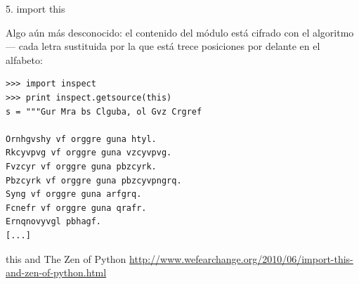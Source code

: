 \documentclass[14pt]{beamer}
\begin{document}
\begin{frame}[fragile]{5. import this}
  \small
  \begin{center}
    Algo aún más desconocido: el contenido del módulo
     está cifrado con el algoritmo
     --- cada letra sustituida por la que está trece
    posiciones por delante en el alfabeto:
  \end{center}

  \begin{exampleblock}{}
    \tiny
    \begin{lstlisting}
>>> import inspect
>>> print inspect.getsource(this)
s = """Gur Mra bs Clguba, ol Gvz Crgref

Ornhgvshy vf orggre guna htyl.
Rkcyvpvg vf orggre guna vzcyvpvg.
Fvzcyr vf orggre guna pbzcyrk.
Pbzcyrk vf orggre guna pbzcyvpngrq.
Syng vf orggre guna arfgrq.
Fcnefr vf orggre guna qrafr.
Ernqnovyvgl pbhagf.
[...]
    \end{lstlisting}
  \end{exampleblock}

  \scriptsize
  \begin{block}{\centering this and The Zen of Python}
    \centering
    \url{http://www.wefearchange.org/2010/06/import-this-and-zen-of-python.html}
  \end{block}
\end{frame}
\end{document}
